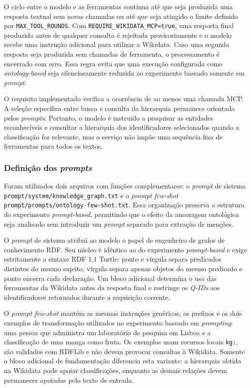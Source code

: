 O ciclo entre o modelo e as ferramentas continua até que seja produzida uma
resposta textual sem novas chamadas ou até que seja atingido o limite definido
por \texttt{MAX\_TOOL\_ROUNDS}. Com
\texttt{REQUIRE\_WIKIDATA\_MCP=true}, uma resposta final produzida antes de
qualquer consulta é rejeitada provisoriamente e o modelo recebe uma instrução
adicional para utilizar a Wikidata. Caso uma segunda resposta seja produzida
sem chamadas de ferramenta, o processamento é encerrado com erro. Essa regra
evita que uma execução configurada como \textit{ontology-based} seja
silenciosamente reduzida ao experimento baseado somente em \textit{prompt}.

O requisito implementado verifica a ocorrência de ao menos uma chamada MCP. A
seleção específica entre busca e consulta da hierarquia permanece orientada
pelos \textit{prompts}. Portanto, o modelo é instruído a pesquisar as entidades
reconhecíveis e consultar a hierarquia dos identificadores selecionados quando
a classificação for relevante, mas o serviço não impõe uma sequência fixa de
ferramentas para todos os textos.

\subsubsection{Definição dos \textit{prompts}}

Foram utilizados dois arquivos com funções complementares: o \textit{prompt}
de sistema \texttt{prompt/system/knowledge\_graph.txt} e o \textit{prompt}
\textit{few-shot}
\texttt{prompt/prompts/ontology-few-shot.txt}. Essa organização preserva a
estrutura do experimento \textit{prompt-based}, permitindo que o efeito da
ancoragem ontológica seja analisado sem introduzir um \textit{prompt} separado
para extração de menções.

O \textit{prompt} de sistema atribui ao modelo o papel de engenheiro de grafos
de conhecimento RDF. Seu núcleo é idêntico ao do experimento
\textit{prompt-based} e exige estritamente a sintaxe RDF 1.1 Turtle: ponto e
vírgula separa predicados distintos do mesmo sujeito, vírgula separa apenas
objetos do mesmo predicado e ponto encerra cada declaração. Um bloco adicional
determina o uso das ferramentas da Wikidata antes da resposta final e restringe
os \textit{Q-IDs} aos identificadores retornados durante a requisição corrente.

O \textit{prompt few-shot} mantém as mesmas instruções genéricas, os prefixos e
os dois exemplos de transformação utilizados no experimento baseado em
\textit{prompting}: uma pessoa que administra um laboratório de pesquisa em
Lisboa e a classificação de uma manga como fruta. Os exemplos usam recursos
locais \texttt{kg:}, são validados com RDFLib e não devem provocar consultas à
Wikidata. Somente o bloco adicional de fundamentação diferencia esta variante:
a hierarquia obtida na Wikidata pode apoiar classificações, enquanto as demais
relações devem permanecer apoiadas pelo texto de entrada.

